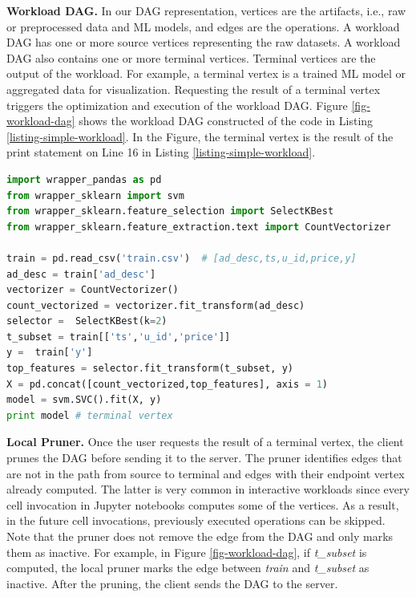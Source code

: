 \textbf{Workload DAG.}
In our DAG representation, vertices are the artifacts, i.e., raw or preprocessed data and ML models, and edges are the operations.
A workload DAG has one or more source vertices representing the raw datasets.
A workload DAG also contains one or more terminal vertices.
Terminal vertices are the output of the workload.
For example, a terminal vertex is a trained ML model or aggregated data for visualization.
Requesting the result of a terminal vertex triggers the optimization and execution of the workload DAG.
Figure \ref{fig-workload-dag} shows the workload DAG constructed of the code in Listing \ref{listing-simple-workload}.
In the Figure, the terminal vertex is the result of the print statement on Line 16 in Listing \ref{listing-simple-workload}.
\begin{lstlisting}[language=Python, caption=Example script,captionpos=b,label = {listing-simple-workload}]
import wrapper_pandas as pd
from wrapper_sklearn import svm
from wrapper_sklearn.feature_selection import SelectKBest
from wrapper_sklearn.feature_extraction.text import CountVectorizer

train = pd.read_csv('train.csv')  # [ad_desc,ts,u_id,price,y]
ad_desc = train['ad_desc']
vectorizer = CountVectorizer()
count_vectorized = vectorizer.fit_transform(ad_desc)
selector =  SelectKBest(k=2)
t_subset = train[['ts','u_id','price']]
y =  train['y']
top_features = selector.fit_transform(t_subset, y)
X = pd.concat([count_vectorized,top_features], axis = 1)
model = svm.SVC().fit(X, y)
print model # terminal vertex
\end{lstlisting}

\textbf{Local Pruner.}
Once the user requests the result of a terminal vertex, the client prunes the DAG before sending it to the server.
The pruner identifies edges that are not in the path from source to terminal and edges with their endpoint vertex already computed.
The latter is very common in interactive workloads since every cell invocation in Jupyter notebooks computes some of the vertices.
As a result, in the future cell invocations, previously executed operations can be skipped.
Note that the pruner does not remove the edge from the DAG and only marks them as inactive.
For example, in Figure \ref{fig-workload-dag}, if \textit{t\_subset} is computed, the local pruner marks the edge between \textit{train} and \textit{t\_subset} as inactive.
After the pruning, the client sends the DAG to the server.

